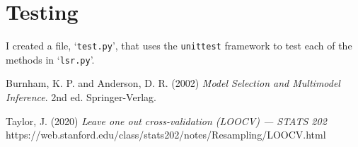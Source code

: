 \documentclass[onecolumn, 12pt, a4paper]{article}
\begin{document}
\section{Testing}

I created a file, `\texttt{test.py}', that uses the
\texttt{unittest} framework to test each of the methods
in `\texttt{lsr.py}'.

\clearpage
\begin{thebibliography}{9}

    Burnham, K. P. and Anderson, D. R. (2002)
    \textit{Model Selection and Multimodel Inference}.
    2nd ed. Springer-Verlag.

    Taylor, J. (2020)
    \textit{Leave one out cross-validation (LOOCV) --- STATS 202}
    https://web.stanford.edu/class/stats202/notes/Resampling/LOOCV.html


\end{thebibliography}
    
\end{document}
